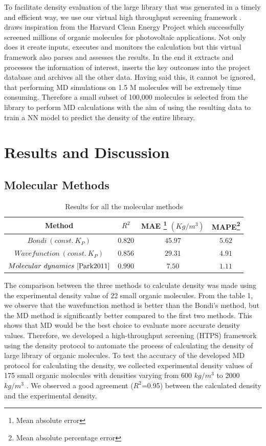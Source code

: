 To facilitate density evaluation of the large library that was generated in a timely and efficient way, we use our virtual high throughput screening framework \chemhtps. \chemhtps draws inspiration from the Harvard Clean Energy Project which successfully screened millions of organic molecules for photovoltaic applications. Not only does it create inputs, executes and monitors the calculation but this virtual framework also parses and assesses the results. In the end it extracts and processes the information of interest, inserts the key outcomes into the project database and archives all the other data. Having said this, it cannot be ignored, that performing MD simulations on 1.5 M molecules will be extremely time consuming. Therefore a small subset of 100,000 molecules is selected from the library to perform MD calculations with the aim of using the resulting data to train a NN model to predict the density of the entire library.

\section{Results and Discussion}
\label{sec:results_discussion}

\subsection{Molecular Methods}
\label{subsec:MD methods}
\begin{table}[htbp]
	\centering
	\begin{tabular}{ |c|c|c|c|  }
		\hline
		Method& $R^2$ &MAE \footnote{Mean absolute error} $(Kg/m^3)$&MAPE\footnote{Mean absolute percentage error}\\
		\hline
		$Bondi\ (const.\ K_P)$  &$0.820$    &$45.97$&  $5.62$\\
		$Wavefunction\ (const.\ K_P)$&$0.856$ &  $29.31$ & $4.91$\\
		$Molecular\ dynamics\ \text{\cite{Park2011}} $& $0.990$ &$7.50$& $1.11$\\
		\hline
		
	\end{tabular}
	\caption{Results for all the molecular methods}
	\label{table: 1}
\end{table}


The comparison between the three methods to calculate density was made using the experimental density value of 22 small organic molecules. From the table 1, we observe that the wavefunction method is better than the Bondi’s method, but the MD method is significantly better compared to the first two methods. This shows that MD would be the best choice to evaluate more accurate density values. Therefore, we developed a high-throughput screening (HTPS) framework using the density protocol to automate the process of calculating the density of large library of organic molecules. To test the accuracy of the developed MD protocol for calculating the density, we collected experimental density values of 175 small organic molecules with densities varying from 600 $kg/m^3$ to 2000 $kg/m^3$ \cite{Piacenza1996}. We observed a good agreement ($R^2$=0.95) between the calculated density and the experimental density. 

